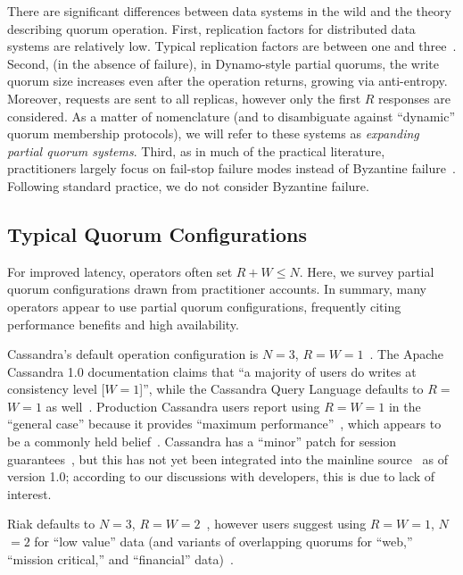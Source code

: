 \documentclass{vldb}
\begin{document}
There are significant differences between data systems in the wild and
the theory describing quorum operation.  First, replication factors
for distributed data systems are relatively low.  Typical replication
factors are between one and three~\cite{cassandradefault, feinbergpc,
  codapc}.  Second, (in the absence of failure), in Dynamo-style
partial quorums, the write quorum size increases even after the
operation returns, growing via anti-entropy.  Moreover, requests
are sent to all replicas, however only the first $R$ responses are
considered.  As a matter of nomenclature (and to disambiguate against
``dynamic'' quorum membership protocols), we will refer to these systems
as \textit{expanding partial quorum systems}.  Third, as in much of
the practical literature, practitioners largely focus on fail-stop
failure modes instead of Byzantine failure~\cite{birman-byzantine}.
Following standard practice, we do not consider Byzantine failure.

\subsection{Typical Quorum Configurations}

For improved latency, operators often set $R+W \leq N$.  Here, we
survey partial quorum configurations drawn from practitioner accounts.
In summary, many operators appear to use partial quorum
configurations, frequently citing performance benefits and high
availability.

 Cassandra's default operation configuration is $N$$=$$3$,
 $R$$=$$W$$=$$1$~\cite{cassandradefault}. The Apache Cassandra 1.0
 documentation claims that ``a majority of users do writes at
 consistency level [$W$$=$$1$]'', while the Cassandra Query Language
 defaults to $R$$=$$W$$=$$1$ as well~\cite{cassandra-docs}.
 Production Cassandra users report using $R$$=$$W$$=$$1$ in the
 ``general case'' because it provides ``maximum
 performance''~\cite{maxperfblog}, which appears to be a commonly held
 belief~\cite{reddit, outbrain}.  Cassandra has a ``minor'' patch for
 session guarantees~\cite{sessionguarantees}, but this has not yet
 been integrated into the mainline source~\cite{cassandra-session} as
 of version 1.0; according to our discussions with developers, this is
 due to lack of interest.

Riak defaults to $N$$=$$3$, $R$$=$$W$$=$$2$~\cite{riakdefault-n,
  riakdefault-rw}, however users suggest using $R$$=$$W$$=$$1$,
$N$$=$$2$ for ``low value'' data (and variants of overlapping quorums
for ``web,'' ``mission critical,'' and ``financial''
data)~\cite{riaktalkone, riaktalktwo}.
\end{document}
